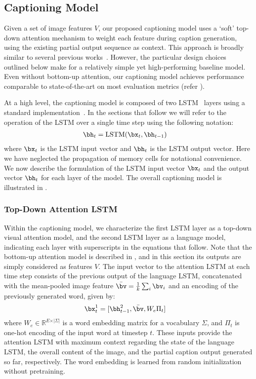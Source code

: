 \documentclass[10pt,twocolumn,letterpaper]{article}
\begin{document}
\subsection{Captioning Model}
\label{sec:cap}

Given a set of image features $V$, our proposed captioning model uses a `soft' top-down attention mechanism to weight each feature during caption generation, using the existing partial output sequence as context. This approach is broadly similar to several previous works~\cite{scst2016,sentinel,Xu2015}. However, the particular design choices outlined below make for a relatively simple yet high-performing baseline model. Even without bottom-up attention, our captioning model achieves performance comparable to state-of-the-art on most evaluation metrics (refer ).

At a high level, the captioning model is composed of two LSTM~\cite{Hochreiter1997} layers using a standard implementation~\cite{Donahue2015}. In the sections that follow we will refer to the operation of the LSTM over a single time step using the following notation:
\begin{align}
\bh_t &= \textrm{LSTM}(\bx_t, \bh_{t-1})
\end{align}
\noindent
where $\bx_t$ is the LSTM input vector and $\bh_t$ is the LSTM output vector. Here we have neglected the propagation of memory cells for notational convenience. We now describe the formulation of the LSTM input vector $\bx_t$ and the output vector $\bh_t$ for each layer of the model. The overall captioning model is illustrated in . 

\subsubsection{Top-Down Attention LSTM}

Within the captioning model, we characterize the first LSTM layer as a top-down visual attention model, and the second LSTM layer as a language model, indicating each layer with superscripts in the equations that follow. Note that the bottom-up attention model is described in , and in this section its outputs are simply considered as features $V$. The input vector to the attention LSTM at each time step consists of the previous output of the language LSTM, concatenated with the mean-pooled image feature $\bar{\bv} = \frac{1}{k}\sum_i \bv_i$ and an encoding of the previously generated word, given by:
\begin{align}
\bx_t^1 &= [\bh_{t-1}^2, \bar{\bv}, W_{e}\Pi_t]
\end{align}
\noindent where $W_{e} \in \mathbb{R}^{E \times \vert\Sigma\vert}$ is a word embedding matrix for a vocabulary $\Sigma$, and $\Pi_t $ is one-hot encoding of the input word at timestep $t$. These inputs provide the attention LSTM with maximum context regarding the state of the language LSTM, the overall content of the image, and the partial caption output generated so far, respectively. The word embedding is learned from random initialization without pretraining.
\end{document}

